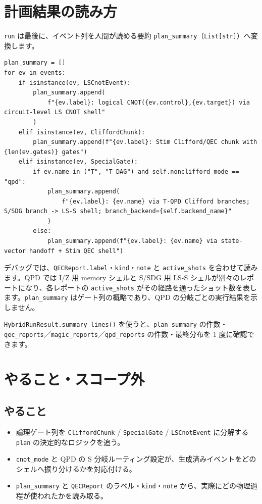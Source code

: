 \section{計画結果の読み方}\label{sec:reading_plan}

\texttt{run} は最後に、イベント列を人間が読める要約 \texttt{plan\_summary}（\texttt{List[str]}）へ変換します。

\begin{lstlisting}[caption={plan\_summary の生成（src/ftqc/hybrid\_ftqc\_runtime.py, run 内）}]
plan_summary = []
for ev in events:
    if isinstance(ev, LSCnotEvent):
        plan_summary.append(
            f"{ev.label}: logical CNOT({ev.control},{ev.target}) via circuit-level LS CNOT shell"
        )
    elif isinstance(ev, CliffordChunk):
        plan_summary.append(f"{ev.label}: Stim Clifford/QEC chunk with {len(ev.gates)} gates")
    elif isinstance(ev, SpecialGate):
        if ev.name in ("T", "T_DAG") and self.nonclifford_mode == "qpd":
            plan_summary.append(
                f"{ev.label}: {ev.name} via T-QPD Clifford branches; S/SDG branch -> LS-S shell; branch_backend={self.backend_name}"
            )
        else:
            plan_summary.append(f"{ev.label}: {ev.name} via state-vector handoff + Stim QEC shell")
\end{lstlisting}

デバッグでは、\texttt{QECReport.label}・\texttt{kind}・\texttt{note} と \texttt{active\_shots} を合わせて読みます。QPD では I/Z 用 memory シェルと S/SDG 用 LS-S シェルが別々のレポートになり、各レポートの \texttt{active\_shots} がその経路を通ったショット数を表します。\texttt{plan\_summary} はゲート列の概略であり、QPD の分岐ごとの実行結果を示しません。

\texttt{HybridRunResult.summary\_lines()} を使うと、\texttt{plan\_summary} の件数・\texttt{qec\_reports}／\texttt{magic\_reports}／\texttt{qpd\_reports} の件数・最終分布を 1 度に確認できます。

\section{やること・スコープ外}\label{sec:plan_scope}

\subsection{やること}

\begin{itemize}
  \item 論理ゲート列を \texttt{CliffordChunk} / \texttt{SpecialGate} / \texttt{LSCnotEvent} に分解する \texttt{plan} の決定的なロジックを追う。
  \item \texttt{cnot\_mode} と QPD の S 分岐ルーティング設定が、生成済みイベントをどのシェルへ振り分けるかを対応付ける。
  \item \texttt{plan\_summary} と \texttt{QECReport} のラベル・\texttt{kind}・\texttt{note} から、実際にどの物理過程が使われたかを読み取る。
\end{itemize}

